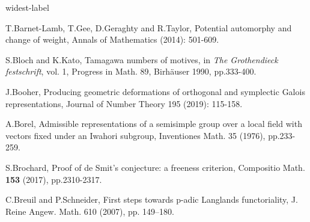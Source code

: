 \documentclass[12pt,oneside,reqno]{amsart}
\theoremstyle{plain}
\begin{document}
\begin{thebibliography}{widest-label}
		
		
		
		T.Barnet-Lamb, T.Gee, D.Geraghty and R.Taylor,
		Potential automorphy and change of weight,
		Annals of Mathematics (2014): 501-609.
		
		
		
		
		
		S.Bloch and K.Kato,
		Tamagawa numbers of motives,
		in
		\textit{The Grothendieck festschrift},
		vol. 1,
		Progress in Math. 89,
		Birh\"{a}user 1990,
		pp.333-400.
		
		
		
		
		
		
		
		
		
		
		
		
		
		
		J.Booher,
		Producing geometric deformations of orthogonal and symplectic Galois representations,
		Journal of Number Theory 195 (2019): 115-158.
		
		
		
		
		
		
		
		
		A.Borel,
		Admissible representations of a semisimple group over a local field with vectors fixed under
		an Iwahori subgroup,
		Inventiones Math.
		35
		(1976),
		pp.233-259.
		
		
		
		
		
		S.Brochard,
		Proof of de Smit's conjecture: a freeness criterion,
		Compositio Math.
		\textbf{153} (2017),
		pp.2310-2317.
		
		
		
		C.Breuil and P.Schneider,
		First steps towards p-adic Langlands functoriality,
		J. Reine Angew. Math. 610 (2007), pp. 149–180.
		
		
		

\end{thebibliography}
\end{document}

